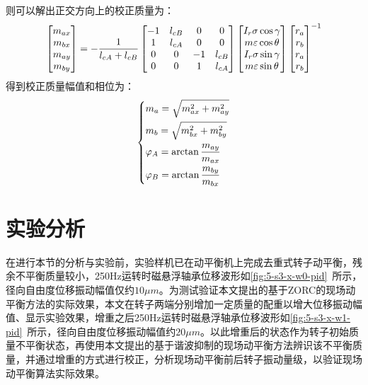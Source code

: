 \documentclass[
  lang=cn,
  degree=master,
  openany,oneside
]{nuaathesis}
\begin{document}
则可以解出正交方向上的校正质量为：
\begin{equation}
\left[ {\begin{matrix}
   {{m_{ax}}}  \cr 
   {{m_{bx}}}  \cr 
   {{m_{ay}}}  \cr 
   {{m_{by}}}  \cr 

 \end{matrix} } \right] =  - {1 \over {{l_{cA}} + {l_{cB}}}}\left[ {\begin{matrix}
   { - 1} & {{l_{cB}}} & 0 & 0  \cr 
   1 & {{l_{cA}}} & 0 & 0  \cr 
   0 & 0 & { - 1} & {{l_{cB}}}  \cr 
   0 & 0 & 1 & {{l_{cA}}}  \cr 

 \end{matrix} } \right]\left[ {\begin{matrix}
   {{I_r}\sigma \cos \gamma }  \cr 
   {m\varepsilon \cos \theta }  \cr 
   {{I_r}\sigma \sin \gamma }  \cr 
   {m\varepsilon \sin \theta }  \cr 

 \end{matrix} } \right]{\left[ {\begin{matrix}
   {{r_a}}  \cr 
   {{r_b}}  \cr 
   {{r_a}}  \cr 
   {{r_b}}  \cr 

 \end{matrix} } \right]^{ - 1}}
\end{equation}
得到校正质量幅值和相位为：
\begin{equation}
\left\{
\begin{aligned}
&{m_a} = \sqrt {m_{ax}^2 + m_{ay}^2}\\
&{m_b} = \sqrt {m_{bx}^2 + m_{by}^2} \\  
&{\varphi _A} = \arctan {{{m_{ay}}} \over {{m_{ax}}}} \\
&{\varphi _B} = \arctan {{{m_{by}}} \over {{m_{bx}}}} \\ 
\end{aligned}
\right.
\end{equation}


\section{实验分析}

在进行本节的分析与实验前，实验样机已在动平衡机上完成去重式转子动平衡，残余不平衡质量较小，250Hz运转时磁悬浮轴承位移波形如\autoref{fig:5-s3-x-w0-pid}~所示，径向自由度位移振动幅值仅约$10\mu m$。为测试验证本文提出的基于ZORC的现场动平衡方法的实际效果，本文在转子两端分别增加一定质量的配重以增大位移振动幅值、显示实验效果，增重之后250Hz运转时磁悬浮轴承位移波形如\autoref{fig:5-s3-x-w1-pid}~所示，径向自由度位移振动幅值约$20\mu m$。以此增重后的状态作为转子初始质量不平衡状态，再使用本文提出的基于谐波抑制的现场动平衡方法辨识该不平衡质量，并通过增重的方式进行校正，分析现场动平衡前后转子振动量级，以验证现场动平衡算法实际效果。
\end{document}
